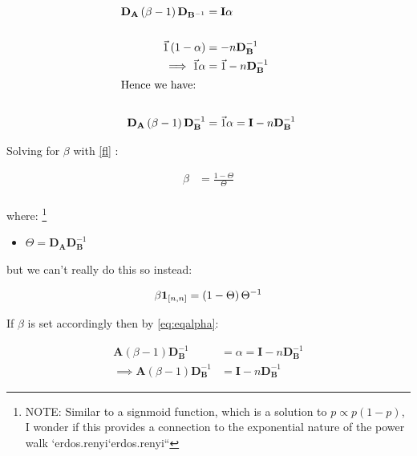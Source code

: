 \documentclass[11pt]{article}
\begin{document}
\begin{align}
\mathbf{D}_{\mathbf{A}}   \left( \beta -  1 \right)\mathbf{D}_{\mathbf{B}^{- 1}} &=\mathbf{I}  \alpha \label{fl} \\
    \ \nonumber \\
  \vec{1}  \left( 1- \alpha \right) &=  - n \mathbf{D}_{\mathbf{B}}^{- 1}  \nonumber \\
    \implies  \vec{1}\alpha &=  \vec{1}- n \mathbf{D}_{\mathbf{B}}^{- 1} \label{st} \\
    \intertext{Hence we have:} \notag \\
\mathbf{D}_{\mathbf{A}}  \left( \beta -  1 \right)\mathbf{D}_{\mathbf{B}}^{- 1} &=  \vec{1}\alpha =  \mathbf{I}- n \mathbf{D}_{\mathbf{B}}^{- 1} \label{eq:eqalpha}
\end{align}


Solving for \(\beta\)  with \eqref{fl} :

\begin{align}
    \beta&= \frac{1- \Theta}{\Theta}\\
\end{align}

where: \footnote{NOTE: Similar to a signmoid function, which is a solution to \(p \propto p(1-p)\), I wonder if this provides a connection to the exponential nature of the power walk
`﻿erdos.renyi﻿`﻿erdos.renyi﻿``}

\begin{itemize}
\item \(\Theta = \mathbf{D}_{\mathbf{A}} \mathbf{D}_{\mathbf{B}}^{- 1}\)
\end{itemize}

but we can't really do this so instead:

\[
\beta \mathbf{1}_{\tiny \left[ n,n \right]}  = \left( 1 - \Theta \right) \Theta^{-1} \label{eq:betadef}
\]

If \(\beta\) is set accordingly then by \eqref{eq:eqalpha}:

\begin{align}
    \mathbf{A}\left( \beta- 1 \right) \mathbf{D}_{\mathbf{B}}^{- 1} &= \alpha = \mathbf{I}- n \mathbf{D}_{\mathbf{B}}^{- 1} \nonumber \\
     \implies  \mathbf{A}\left( \beta- 1 \right) \mathbf{D}_{\mathbf{B}}^{- 1} &=  \mathbf{I}- n \mathbf{D}_{\mathbf{B}}^{- 1}
\end{align}
\end{document}
